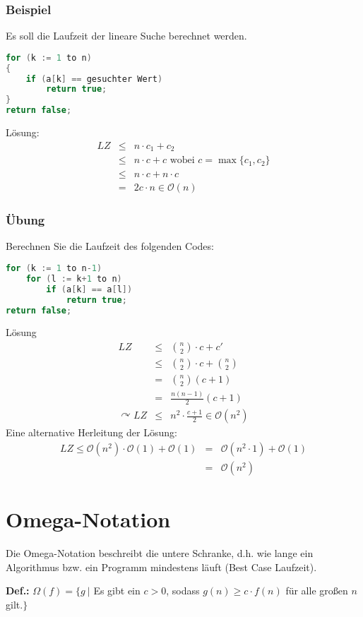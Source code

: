 \subsubsection{Beispiel}
Es soll die Laufzeit der lineare Suche berechnet werden.
\begin{lstlisting}[language=java, caption={Pseudocode zur Berechnung der Laufzeit}]
for (k := 1 to n)
{
	if (a[k] == gesuchter Wert)
		return true;
}
return false;
\end{lstlisting}
Lösung:
\begin{eqnarray*}
	LZ	&\leq& n \cdot c_{1} + c_{2} \\
		&\leq& n \cdot c + c  \textrm{ wobei } c= \max\{c_{1},c_{2}\} \\
		&\leq& n \cdot c + n \cdot c	\\
		&=& 2c \cdot n \in \mathcal{O}(n)
\end{eqnarray*}

\subsubsection{Übung}
Berechnen Sie die Laufzeit des folgenden Codes:
\begin{lstlisting}[language=java, caption={Pseudocode zur Berechnung der Laufzeit}]
for (k := 1 to n-1)
	for (l := k+1 to n)
		if (a[k] == a[l])
			return true;
return false;
\end{lstlisting}
Lösung
\begin{eqnarray*}
	LZ	&\leq& \binom{n}{2} \cdot c + c' \\
		&\leq& \binom{n}{2} \cdot c + \binom{n}{2} \\
		&=& \binom{n}{2}(c+1)	\\
		&=& \frac{n(n-1)}{2}(c+1)	\\
\curvearrowright LZ &\leq& n^{2} \cdot \frac{c+1}{2} \in \mathcal{O}(n^{2})
\end{eqnarray*}
Eine alternative Herleitung der Lösung:
\begin{eqnarray*}
	LZ \leq \mathcal{O}(n^{2}) \cdot \mathcal{O}(1) + \mathcal{O}(1) &=& \mathcal{O}(n^{2} \cdot 1) + \mathcal{O}(1)	\\
		&=& \mathcal{O}(n^{2})
\end{eqnarray*}


\section{Omega-Notation}
\label{sec:OmegaNotation}
Die Omega-Notation beschreibt die untere Schranke, d.h. wie lange ein Algorithmus bzw. ein Programm mindestens läuft (Best Case Laufzeit).
\begin{shaded}
	\noindent
	\textbf{Def.:} \(\Omega(f) = \{ g \:|\) Es gibt ein \(c > 0\), sodass \(g(n) \geq c \cdot f(n)\) für alle großen \(n\) gilt.\(\}\)
\end{shaded}

